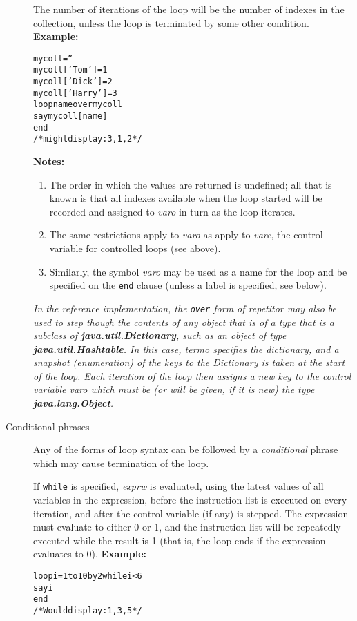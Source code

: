 \begin{description}
The number of iterations of the loop will be the number of indexes in
the collection, unless the loop is terminated by some other condition.
 \textbf{Example:}
\begin{alltt}
mycoll=''
mycoll['Tom']=1
mycoll['Dick']=2
mycoll['Harry']=3
loop name over mycoll
  say mycoll[name]
  end
/* might display: 3, 1, 2 */
\end{alltt}
 \textbf{Notes:}
\begin{enumerate}
\item 
The order in which the values are returned is undefined; all that
is known is that all indexes available when the loop started will be
recorded and assigned to \emph{varo} in turn as the loop iterates.
\item 
The same restrictions apply to \emph{varo} as apply to
\emph{varc}, the control variable for controlled loops (see above).
\item 
Similarly, the symbol \emph{varo} may be used as a name for the loop
and be specified on the \texttt{end} clause (unless a label is
specified, see below).
\end{enumerate}
 \emph{In the reference implementation, the \texttt{over} form of
repetitor may also be used to step though the contents of any object
that is of a type that is a subclass of \textbf{java.util.Dictionary},
such as an object of type \textbf{java.util.Hashtable}.
In this case, \emph{termo} specifies the dictionary, and a snapshot
(enumeration) of the keys to the Dictionary is taken at the start of the
loop.
Each iteration of the loop then assigns a new key to the control
variable \emph{varo} which must be (or will be given, if it is new)
the type \textbf{java.lang.Object}.
}
\item[Conditional phrases]\label{refloopwu}

Any of the forms of loop syntax can be followed by a
\emph{conditional} phrase which may cause termination of the loop.
 
If \texttt{while} is specified, \emph{exprw} is evaluated, using the
latest values of all variables in the expression, before the instruction
list is executed on every iteration, and after the control
variable (if any) is stepped.
The expression must evaluate to either 0 or 1, and the instruction list
will be repeatedly executed while the result is 1 (that is, the loop
ends if the expression evaluates to 0).
 \textbf{Example:}
\begin{alltt}
loop i=1 to 10 by 2 while i<6
  say i
  end
/* Would display: 1, 3, 5 */
\end{alltt}
 

\end{description}
